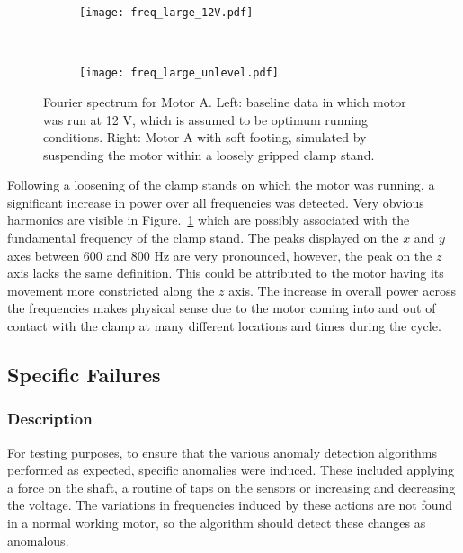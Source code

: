 \begin{figure}[t!]
    \centering
    \begin{subfigure}[t]{0.5\textwidth}
        \centering
        \texttt{[image: freq\_large\_12V.pdf]}
    \end{subfigure}%
    ~ 
    \begin{subfigure}[t]{0.5\textwidth}
        \centering
        \texttt{[image: freq\_large\_unlevel.pdf]}
    \end{subfigure}
    \caption[Fourier Plot Soft Footing]{Fourier spectrum for Motor A. Left: baseline data in which motor was run at 12 V, which is assumed to be optimum running conditions. Right: Motor A with soft footing, simulated by suspending the motor within a loosely gripped clamp stand. }
    \label{soft_footing}
\end{figure}

Following a loosening of the clamp stands on which the motor was running, a significant increase in power over all frequencies was detected. Very obvious harmonics are visible in Figure.~\ref{soft_footing} which are possibly associated with the fundamental frequency of the clamp stand. The peaks displayed on the $x$ and $y$ axes between 600 and 800 Hz are very pronounced, however, the peak on the $z$ axis lacks the same definition. This could be attributed to the motor having its movement more constricted along the $z$ axis. The increase in overall power across the frequencies makes physical sense due to the motor coming into and out of contact with the clamp at many different locations and times during the cycle.


\subsection{Specific Failures}

\subsubsection{Description}

For testing purposes, to ensure that the various anomaly detection algorithms performed as expected, specific anomalies were induced. These included applying a force on the shaft, a routine of taps on the sensors or increasing and decreasing the voltage. The variations in frequencies induced by these actions are not found in a normal working motor, so the algorithm should detect these changes as anomalous. 

